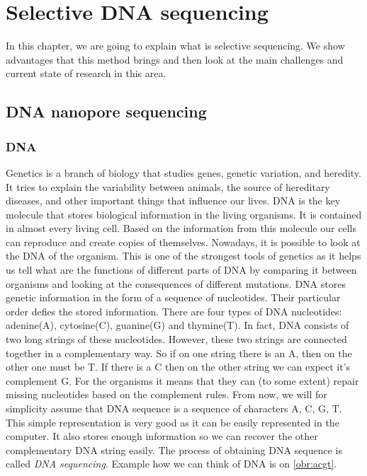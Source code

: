 \chapter{Selective DNA sequencing}

\label{kap:selSeq} %

In this chapter, we are going to explain what is selective sequencing. We
show advantages that this method brings and then look at the main challenges and
current state of research in this area.

\section{DNA nanopore sequencing}

\subsection{DNA}

Genetics is a branch of biology that studies genes, genetic variation, and heredity.
It tries to explain the variability between animals, the source of hereditary diseases, and
other important things that influence our lives. DNA is the key molecule
that stores biological information in the living organisms. It is contained in
almost every living cell. Based on the information from this molecule our cells can reproduce and create copies of
themselves. Nowadays, it is possible to look at the DNA of the organism. This is
one of the strongest tools of genetics as it helps us tell what are the functions
of different parts of DNA by comparing it between organisms and looking at the
consequences of different mutations. DNA stores genetic information in the form of a sequence of
nucleotides. Their particular order defies the stored information. There are four types of DNA nucleotides:
adenine(A), cytosine(C), guanine(G) and thymine(T). In fact, DNA consists of two long
strings of these nucleotides. However, these two strings are connected together
in a complementary way. So if on one string there is an A, then on the other
one must be T. If there is a C then on the other string we can expect
it's complement G. For the organisms it means that they can (to some extent) repair
missing nucleotides based on the complement rules. From now, we will for simplicity
assume that DNA sequence is a sequence of characters A, C, G, T. This simple representation
is very good as it can be easily represented in the computer. It also stores enough
information so we can recover the other complementary DNA string easily. The process of obtaining DNA
sequence is called \textit{DNA sequencing}. Example how we can think of DNA is on \ref{obr:acgt}.

